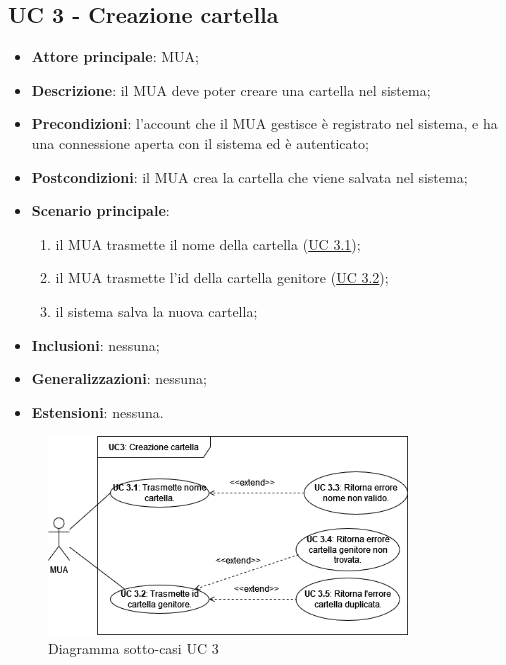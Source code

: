 \subsection{UC 3 - Creazione cartella} \label{sec:UC3}
    \begin{itemize}
        \item \textbf{Attore principale}: MUA;
        \item \textbf{Descrizione}: il MUA deve poter creare una cartella nel sistema;
        \item \textbf{Precondizioni}: l’account che il MUA gestisce è registrato nel sistema, e ha una connessione aperta con il sistema ed è autenticato;
        \item \textbf{Postcondizioni}: il MUA crea la cartella che viene salvata nel sistema;
        \item \textbf{Scenario principale}:
            \begin{enumerate}
                \item il MUA trasmette il nome della cartella (\hyperref[sec:UC3.1]{UC 3.1});
                \item il MUA trasmette l'id della cartella genitore (\hyperref[sec:UC3.2]{UC 3.2});
                \item il sistema salva la nuova cartella;
            \end{enumerate}
        \item \textbf{Inclusioni}: nessuna;
        \item \textbf{Generalizzazioni}: nessuna;
        \item \textbf{Estensioni}: nessuna.
    \end{itemize}

\begin{figure}[H]
    \includegraphics[width=0.85\textwidth]{sections/uc_imgs/UC03.png}
    \centering
    \caption{Diagramma sotto-casi UC 3}
\end{figure}

